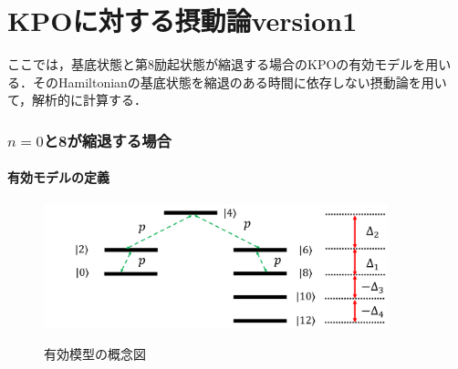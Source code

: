 

\part{KPOに対する摂動論version1}
ここでは，基底状態と第8励起状態が縮退する場合のKPOの有効モデルを用いる．そのHamiltonianの基底状態を縮退のある時間に依存しない摂動論を用いて，解析的に計算する．

\section{$n=0$と8が縮退する場合}
\subsection{有効モデルの定義}
\begin{figure}[h]
\centering
		\includegraphics[width=10cm]{file/fig/effective_0and8/KPO_effective_0and8.png} \\
\caption{有効模型の概念図}
\label{fig:kpo_effective_0and8}
\end{figure}

